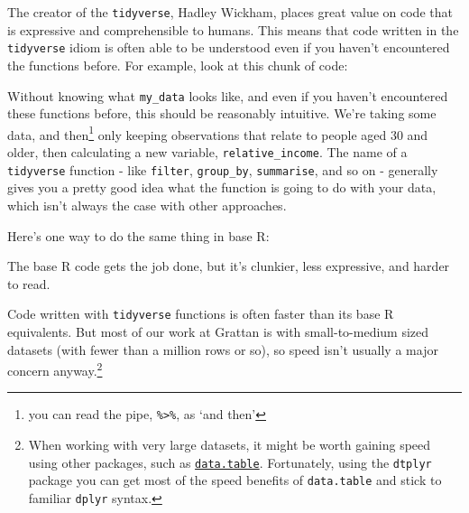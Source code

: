 \documentclass[]{book}
\newenvironment{Shaded}{\begin{snugshade}}{\end{snugshade}}
\newcommand{\DataTypeTok}[1]{\textcolor[rgb]{0.13,0.29,0.53}{#1}}
\newcommand{\DecValTok}[1]{\textcolor[rgb]{0.00,0.00,0.81}{#1}}
\newcommand{\KeywordTok}[1]{\textcolor[rgb]{0.13,0.29,0.53}{\textbf{#1}}}
\newcommand{\NormalTok}[1]{#1}
\newcommand{\OperatorTok}[1]{\textcolor[rgb]{0.81,0.36,0.00}{\textbf{#1}}}
\newcommand{\StringTok}[1]{\textcolor[rgb]{0.31,0.60,0.02}{#1}}
\let\rmarkdownfootnote\footnote%
\def\footnote{\protect\rmarkdownfootnote}
\begin{document}
The creator of the \texttt{tidyverse}, Hadley Wickham, places great value on code that is expressive and comprehensible to humans. This means that code written in the \texttt{tidyverse} idiom is often able to be understood even if you haven't encountered the functions before. For example, look at this chunk of code:

\begin{Shaded}
\end{Shaded}

Without knowing what \texttt{my\_data} looks like, and even if you haven't encountered these functions before, this should be reasonably intuitive. We're taking some data, and then\footnote{you can read the pipe, \texttt{\%\textgreater{}\%}, as `and then'} only keeping observations that relate to people aged 30 and older, then calculating a new variable, \texttt{relative\_income}. The name of a \texttt{tidyverse} function - like \texttt{filter}, \texttt{group\_by}, \texttt{summarise}, and so on - generally gives you a pretty good idea what the function is going to do with your data, which isn't always the case with other approaches.

Here's one way to do the same thing in base R:

\begin{Shaded}
\end{Shaded}

The base R code gets the job done, but it's clunkier, less expressive, and harder to read.

Code written with \texttt{tidyverse} functions is often faster than its base R equivalents. But most of our work at Grattan is with small-to-medium sized datasets (with fewer than a million rows or so), so speed isn't usually a major concern anyway.\footnote{When working with very large datasets, it might be worth gaining speed using other packages, such as \href{https://cran.r-project.org/web/packages/data.table/vignettes/datatable-intro.html}{\texttt{data.table}}. Fortunately, using the \texttt{dtplyr} package you can get most of the speed benefits of \texttt{data.table} and stick to familiar \texttt{dplyr} syntax.}
\end{document}

